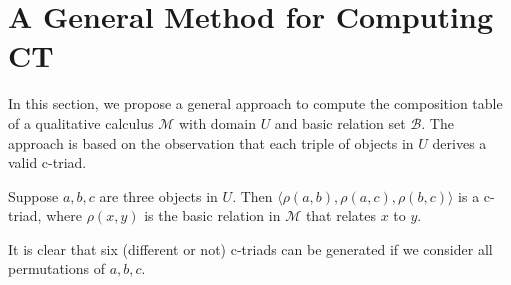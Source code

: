 \documentclass{llncs}
\newcommand{\qcm}{\mathcal{M}}
\begin{document}


\section{A General Method for Computing CT}
In this section, we propose a general approach to compute the composition table of a qualitative calculus $\qcm$ with domain $U$ and basic relation set $\mathcal{B}$. The approach is based on the observation that each triple of objects in $U$ derives a valid c-triad.
\begin{proposition}\label{lemma:abc}
Suppose $a,b,c$ are three objects in $U$. Then $\langle\rho(a,b),\rho(a,c),\rho(b,c)\rangle$ is a c-triad, where $\rho(x,y)$ is the basic relation in $\qcm$ that relates $x$ to $y$.
\end{proposition}
It is clear that six (different or not) c-triads can be generated if we consider all permutations of $a,b,c$.
\end{document}
